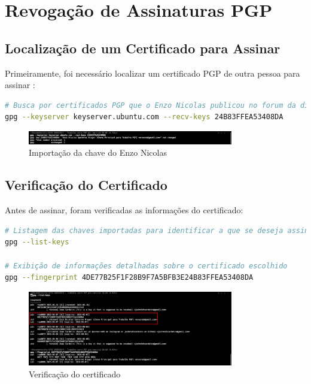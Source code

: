 \chapter{Revogação de Assinaturas PGP}

\section{Localização de um Certificado para Assinar}
Primeiramente, foi necessário localizar um certificado PGP de outra pessoa para assinar \cite{gnupgkeysigning}:

\begin{lstlisting}[language=bash]
# Busca por certificados PGP que o Enzo Nicolas publicou no forum da disciplina
gpg --keyserver keyserver.ubuntu.com --recv-keys 24B83FFEA53408DA
\end{lstlisting}

\begin{figure}[htb]
    \centering
    \includegraphics[width=0.8\textwidth]{images/03-importacao_chave_enzo_nicolas.jpg}
    \caption{Importação da chave do Enzo Nicolas}
    \label{fig:importacao-chave-enzo}
\end{figure}

\section{Verificação do Certificado}
Antes de assinar, foram verificadas as informações do certificado:

\begin{lstlisting}[language=bash]
# Listagem das chaves importadas para identificar a que se deseja assinar
gpg --list-keys

# Exibição de informações detalhadas sobre o certificado escolhido
gpg --fingerprint 4DE77B25F1F28B9F7A5BFB3E24B83FFEA53408DA
\end{lstlisting}

\begin{figure}[htb]
    \centering
    \includegraphics[width=0.8\textwidth]{images/03-verificacao_certificado.jpeg}
    \caption{Verificação do certificado}
    \label{fig:verificacao-certificado}
\end{figure}

